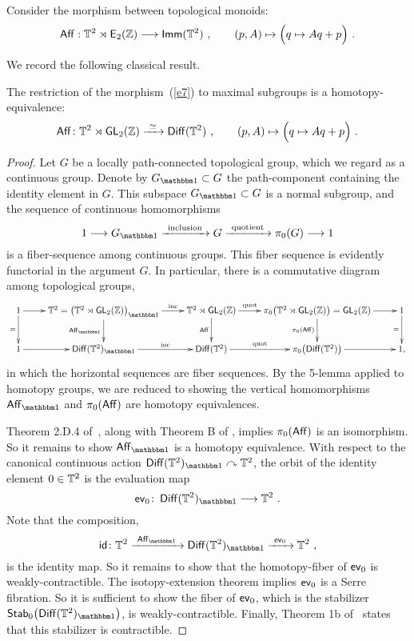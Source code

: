 Consider the morphism between topological monoids:
\begin{equation}
\label{e7}
\operatorname{\sf Aff}: \mathbb T^2 \rtimes \operatorname{\mathsf E_2(\mathbb Z)} 
\longrightarrow
\operatorname{\sf Imm}(\mathbb T^2)
~,\qquad
(p, A)
\mapsto
\Bigl(
q\mapsto 
Aq + p
\Bigr)
~.
\end{equation}


We record the following classical result.
\begin{lemma}\label{t1}
The restriction of the morphism~(\ref{e7}) to maximal subgroups is a homotopy-equivalence:
\[
\operatorname{\sf Aff} \colon
\mathbb T^2 \rtimes \operatorname{\sf GL}_2(\mathbb Z)
\xrightarrow{~\simeq~}
\operatorname{{\sf Diff}}(\mathbb T^2)
~,\qquad
(p, A)
\mapsto
\Bigl(
q\mapsto 
Aq + p
\Bigr)
~.
\]
\end{lemma}


\begin{proof}
Let $G$ be a locally path-connected topological group, which we regard as a continuous group.
Denote by $G_{\uno} \subset G$ the path-component containing the identity element in $G$.
This subspace $G_{\uno}\subset G$ is a normal subgroup, and the sequence of continuous homomorphisms
\[
1
\longrightarrow
G_{\uno}
\xra{~\rm inclusion~}
G
\xra{~\rm quotient~}
\pi_0(G)
\longrightarrow
1
\]
is a fiber-sequence among continuous groups.
This fiber sequence is evidently functorial in the argument $G$.
In particular, there is a commutative diagram among topological groups,
\[
\xymatrix{
1 \ar[d]_-= \ar[r]
&
\TT^{2} = \bigl( \TT^{2} \rtimes \GL_2(\ZZ) \bigr)_{\uno}
\ar[d]_-{\Aff_{\uno}}
\ar[r]^-{\rm inc}
&
\TT^{2} \rtimes \GL_2(\ZZ)  
\ar[d]_-{\Aff} 
\ar[r]^-{\rm quot}
&
\pi_0 \bigl( \TT^{2} \rtimes  \GL_2(\ZZ) \bigr)
=
\GL_2(\ZZ)
\ar[d]_-{\pi_0(\Aff)}
\ar[r]
&
1 \ar[d]_-=
\\
1
\ar[r]
&
\Diff(\TT^2)_{\uno}
\ar[r]^-{\rm inc}
&
\Diff(\TT^2) 
\ar[r]^-{\rm quot}
&
\pi_0 \bigl( \Diff(\TT^2) \bigr)
\ar[r]
&
1
,
}
\] 
in which the horizontal sequences are fiber sequences.  
By the 5-lemma applied to homotopy groups, we are reduced to showing the vertical homomorphisms $\Aff_{\uno}$ and $\pi_0(\operatorname{\sf Aff})$ are homotopy equivalences.



Theorem 2.D.4 of~\cite{rolf}, along with Theorem B of \cite{TT}, implies $\pi_0(\operatorname{\sf Aff})$ is an isomorphism.  
So it remains to show $\Aff_{\uno}$ is a homotopy equivalence. 
With respect to the canonical continuous action $\Diff(\TT^2)_{\uno} \lacts \TT^2$, 
the orbit of the identity element $0\in \mathbb T^2$ is the evaluation map 
\[
\ev_0
\colon 
\Diff(\TT^2)_{\uno}
\longrightarrow
\TT^2
~.
\]
Note that the composition,
\[
\id
\colon
\TT^2
\xra{~\Aff_{\uno}~}
\Diff(\TT^2)_{\uno}
\xra{~\ev_0~}
\TT^2
~,
\]
is the identity map.
So it remains to show that the homotopy-fiber of $\operatorname{\mathsf{ev}}_0$ is weakly-contractible.  
The isotopy-extension theorem implies $\operatorname{\mathsf{ev}}_0$ is a Serre fibration.  
So it is sufficient to show the fiber of $\operatorname{\mathsf{ev}}_0$, which is the stabilizer
${\sf Stab}_0\bigl(\Diff(\TT^2)_{\uno}\bigr)$,
is weakly-contractible.  
Finally, Theorem 1b of~\cite{ee} states that this stabilizer is contractible.  

\end{proof}






